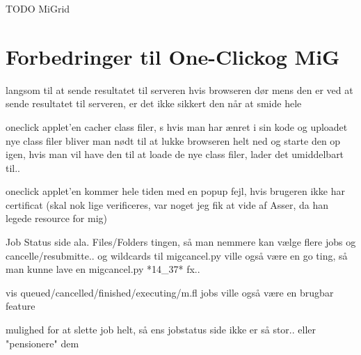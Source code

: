 \documentclass[draft,a4paper,10pt]{article}
\newcommand{\mig}{MiG}
\newcommand{\oc}{One-Click}
\begin{document}


TODO MiGrid
\section{Forbedringer til \oc og \mig}
%
langsom til at sende resultatet til serveren hvis browseren dør mens den er ved
at sende resultatet til serveren, er det ikke sikkert den når at smide hele

oneclick applet'en cacher class filer, s hvis man har ænret i sin kode og
uploadet nye class filer bliver man nødt til at lukke browseren helt ned og
starte den op igen, hvis man vil have den til at loade de nye class filer, lader
det umiddelbart til.. 

oneclick applet'en kommer hele tiden med en popup fejl, hvis brugeren ikke har
certificat (skal nok lige verificeres, var noget jeg fik at vide af Asser, da
han legede resource for mig)

Job Status side ala. Files/Folders
tingen, så man nemmere kan vælge flere jobs og cancelle/resubmitte.. og
wildcards til migcancel.py ville også være en go ting, så man kunne lave en
migcancel.py *14\_37* fx.. 

vis queued/cancelled/finished/executing/m.fl jobs ville også være en brugbar feature

mulighed for at slette job helt, så ens jobstatus side ikke er så stor.. eller
"pensionere" dem
\end{document}
